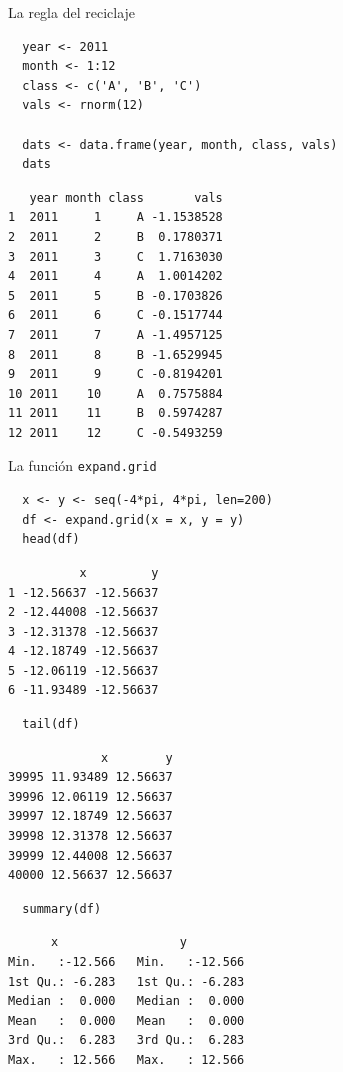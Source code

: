 \documentclass[xcolor={usenames,svgnames,dvipsnames}]{beamer}
\begin{document}
\begin{frame}[fragile,label=sec-3-2-3]{La regla del reciclaje}
 \lstset{language=R,label= ,caption= ,numbers=none}
\begin{lstlisting}
  year <- 2011
  month <- 1:12
  class <- c('A', 'B', 'C')
  vals <- rnorm(12)
  
  dats <- data.frame(year, month, class, vals)
  dats
\end{lstlisting}

\begin{verbatim}
   year month class       vals
1  2011     1     A -1.1538528
2  2011     2     B  0.1780371
3  2011     3     C  1.7163030
4  2011     4     A  1.0014202
5  2011     5     B -0.1703826
6  2011     6     C -0.1517744
7  2011     7     A -1.4957125
8  2011     8     B -1.6529945
9  2011     9     C -0.8194201
10 2011    10     A  0.7575884
11 2011    11     B  0.5974287
12 2011    12     C -0.5493259
\end{verbatim}
\end{frame}

\begin{frame}[fragile,label=sec-3-2-4]{La función \texttt{expand.grid}}
 \lstset{language=R,label= ,caption= ,numbers=none}
\begin{lstlisting}
  x <- y <- seq(-4*pi, 4*pi, len=200)
  df <- expand.grid(x = x, y = y)
  head(df)
\end{lstlisting}

\begin{verbatim}
          x         y
1 -12.56637 -12.56637
2 -12.44008 -12.56637
3 -12.31378 -12.56637
4 -12.18749 -12.56637
5 -12.06119 -12.56637
6 -11.93489 -12.56637
\end{verbatim}

\lstset{language=R,label= ,caption= ,numbers=none}
\begin{lstlisting}
  tail(df)
\end{lstlisting}

\begin{verbatim}
             x        y
39995 11.93489 12.56637
39996 12.06119 12.56637
39997 12.18749 12.56637
39998 12.31378 12.56637
39999 12.44008 12.56637
40000 12.56637 12.56637
\end{verbatim}

\lstset{language=R,label= ,caption= ,numbers=none}
\begin{lstlisting}
  summary(df)
\end{lstlisting}

\begin{verbatim}
      x                 y          
Min.   :-12.566   Min.   :-12.566  
1st Qu.: -6.283   1st Qu.: -6.283  
Median :  0.000   Median :  0.000  
Mean   :  0.000   Mean   :  0.000  
3rd Qu.:  6.283   3rd Qu.:  6.283  
Max.   : 12.566   Max.   : 12.566
\end{verbatim}
\end{frame}
\end{document}
